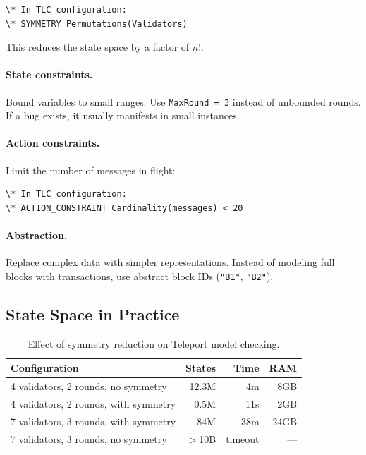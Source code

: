 \documentclass[11pt,a4paper]{article}
\begin{document}
\begin{lstlisting}[language=TLA,caption={Symmetry reduction}]
\* In TLC configuration:
\* SYMMETRY Permutations(Validators)
\end{lstlisting}

This reduces the state space by a factor of $n!$.

\paragraph{State constraints.}
Bound variables to small ranges. Use \texttt{MaxRound = 3} instead of unbounded rounds.
If a bug exists, it usually manifests in small instances.

\paragraph{Action constraints.}
Limit the number of messages in flight:

\begin{lstlisting}[language=TLA,caption={Action constraint to limit state space}]
\* In TLC configuration:
\* ACTION_CONSTRAINT Cardinality(messages) < 20
\end{lstlisting}

\paragraph{Abstraction.}
Replace complex data with simpler representations. Instead of modeling full blocks
with transactions, use abstract block IDs (\texttt{"B1"}, \texttt{"B2"}).

\subsection{State Space in Practice}

\begin{table}[H]
\centering
\small
\begin{tabular}{@{}lrrr@{}}
\toprule
\textbf{Configuration} & \textbf{States} & \textbf{Time} & \textbf{RAM} \\
\midrule
4 validators, 2 rounds, no symmetry & 12.3M & 4m & 8GB \\
4 validators, 2 rounds, with symmetry & 0.5M & 11s & 2GB \\
7 validators, 3 rounds, with symmetry & 84M & 38m & 24GB \\
7 validators, 3 rounds, no symmetry & $>$10B & timeout & --- \\
\bottomrule
\end{tabular}
\caption{Effect of symmetry reduction on Teleport model checking.}
\end{table}
\end{document}
